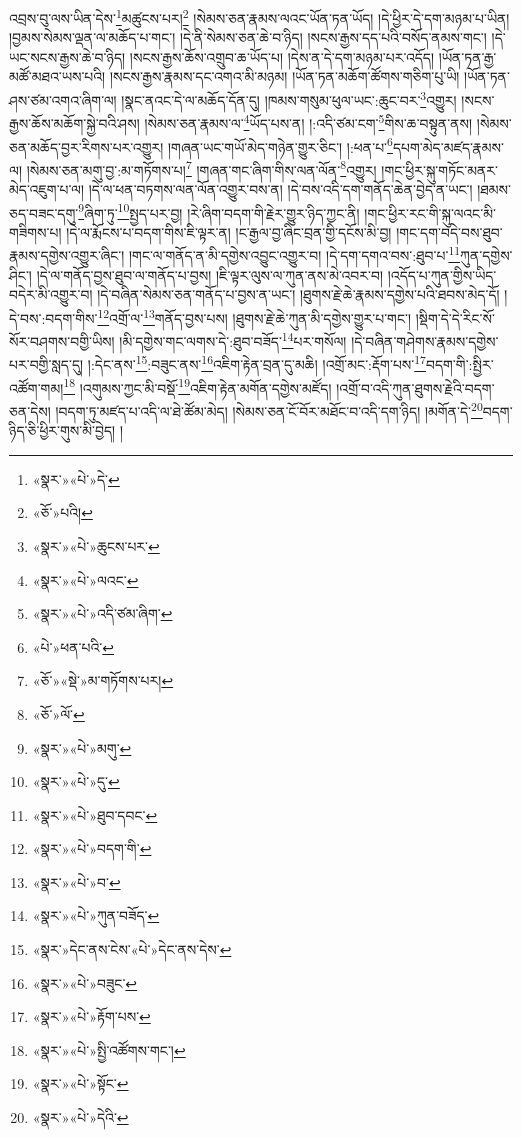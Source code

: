 འབྲས་བུ་ལས་ཡིན་དེས་\footnote{«སྣར་»«པེ་»དེ་}མཚུངས་པར།\footnote{«ཅོ་»པའི།} །སེམས་ཅན་རྣམས་ལའང་ཡོན་ཏན་ཡོད། །དེ་ཕྱིར་དེ་དག་མཉམ་པ་ཡིན། །བྱམས་སེམས་ལྡན་ལ་མཆོད་པ་གང་། །དེ་ནི་སེམས་ཅན་ཆེ་བ་ཉིད། །སངས་རྒྱས་དད་པའི་བསོད་ནམས་གང་། །དེ་ཡང་སངས་རྒྱས་ཆེ་བ་ཉིད། །སངས་རྒྱས་ཆོས་འགྲུབ་ཆ་ཡོད་པ། །དེས་ན་དེ་དག་མཉམ་པར་འདོད། །ཡོན་ཏན་རྒྱ་མཚོ་མཐའ་ཡས་པའི། །སངས་རྒྱས་རྣམས་དང་འགའ་མི་མཉམ། །ཡོན་ཏན་མཆོག་ཚོགས་གཅིག་པུ་ཡི། །ཡོན་ཏན་ཤས་ཙམ་འགའ་ཞིག་ལ། །སྣང་ནའང་དེ་ལ་མཆོད་དོན་དུ། །ཁམས་གསུམ་ཕུལ་ཡང་:ཆུང་བར་\footnote{«སྣར་»«པེ་»ཆུངས་པར་}འགྱུར། །སངས་རྒྱས་ཆོས་མཆོག་སྐྱེ་བའི་ཤས། །སེམས་ཅན་རྣམས་ལ་\footnote{«སྣར་»«པེ་»ལའང་}ཡོད་པས་ན། །:འདི་ཙམ་ངག་\footnote{«སྣར་»«པེ་»འདི་ཙམ་ཞིག་}གིས་ཆ་བསྟུན་ནས། །སེམས་ཅན་མཆོད་བྱར་རིགས་པར་འགྱུར། །གཞན་ཡང་གཡོ་མེད་གཉེན་གྱུར་ཅིང་། །:ཕན་པ་\footnote{«པེ་»ཕན་པའི་}དཔག་མེད་མཛད་རྣམས་ལ། །སེམས་ཅན་མགུ་བྱ་:མ་གཏོགས་པ།\footnote{«ཅོ་»«སྡེ་»མ་གཏོགས་པར།} །གཞན་གང་ཞིག་གིས་ལན་ལོན་\footnote{«ཅོ་»ལོ་}འགྱུར། །གང་ཕྱིར་སྐུ་གཏོང་མནར་མེད་འཇུག་པ་ལ། །དེ་ལ་ཕན་བཏགས་ལན་ལོན་འགྱུར་བས་ན། །དེ་བས་འདི་དག་གནོད་ཆེན་བྱེད་ན་ཡང་། །ཐམས་ཅད་བཟང་དགུ་\footnote{«སྣར་»«པེ་»མགུ་}ཞིག་ཏུ་\footnote{«སྣར་»«པེ་»དུ་}སྤྱད་པར་བྱ། །རེ་ཞིག་བདག་གི་རྗེར་གྱུར་ཉིད་ཀྱང་ནི། །གང་ཕྱིར་རང་གི་སྐུ་ལའང་མི་གཟིགས་པ། །དེ་ལ་རྨོངས་པ་བདག་གིས་ཇི་ལྟར་ན། །ང་རྒྱལ་བྱ་ཞིང་བྲན་གྱི་དངོས་མི་བྱ། །གང་དག་བདེ་བས་ཐུབ་རྣམས་དགྱེས་འགྱུར་ཞིང་། །གང་ལ་གནོད་ན་མི་དགྱེས་འབྱུང་འགྱུར་བ། །དེ་དག་དགའ་བས་:ཐུབ་པ་\footnote{«སྣར་»«པེ་»ཐུབ་དབང་}ཀུན་དགྱེས་ཤིང་། །དེ་ལ་གནོད་བྱས་ཐུབ་ལ་གནོད་པ་བྱས། །ཇི་ལྟར་ལུས་ལ་ཀུན་ནས་མེ་འབར་བ། །འདོད་པ་ཀུན་གྱིས་ཡིད་བདེར་མི་འགྱུར་བ། །དེ་བཞིན་སེམས་ཅན་གནོད་པ་བྱས་ན་ཡང་། །ཐུགས་རྗེ་ཆེ་རྣམས་དགྱེས་པའི་ཐབས་མེད་དོ། །དེ་བས་:བདག་གིས་\footnote{«སྣར་»«པེ་»བདག་གི་}འགྲོ་ལ་\footnote{«སྣར་»«པེ་»བ་}གནོད་བྱས་པས། །ཐུགས་རྗེ་ཆེ་ཀུན་མི་དགྱེས་གྱུར་པ་གང་། །སྡིག་དེ་དེ་རིང་སོ་སོར་བཤགས་བགྱི་ཡིས། །མི་དགྱེས་གང་ལགས་དེ་:ཐུབ་བཟོད་\footnote{«སྣར་»«པེ་»ཀུན་བཟོད་}པར་གསོལ། །དེ་བཞིན་གཤེགས་རྣམས་དགྱེས་པར་བགྱི་སླད་དུ། །:དེང་ནས་\footnote{«སྣར་»དེང་ནས་ངེས་«པེ་»དེང་ནས་དེས་}:བཟུང་ནས་\footnote{«སྣར་»«པེ་»བཟུང་}འཇིག་རྟེན་བྲན་དུ་མཆི། །འགྲོ་མང་:རྡོག་པས་\footnote{«སྣར་»«པེ་»རྟོག་པས་}བདག་གི་:སྤྱིར་འཚོག་གམ།\footnote{«སྣར་»«པེ་»སྤྱི་འཚོགས་གང་།} །འགུམས་ཀྱང་མི་བསྡོ་\footnote{«སྣར་»«པེ་»སྟོང་}འཇིག་རྟེན་མགོན་དགྱེས་མཛོད། །འགྲོ་བ་འདི་ཀུན་ཐུགས་རྗེའི་བདག་ཅན་དེས། །བདག་ཏུ་མཛད་པ་འདི་ལ་ཐེ་ཚོམ་མེད། །སེམས་ཅན་ངོ་བོར་མཐོང་བ་འདི་དག་ཉིད། །མགོན་དེ་\footnote{«སྣར་»«པེ་»དེའི་}བདག་ཉིད་ཅི་ཕྱིར་གུས་མི་བྱེད། །
